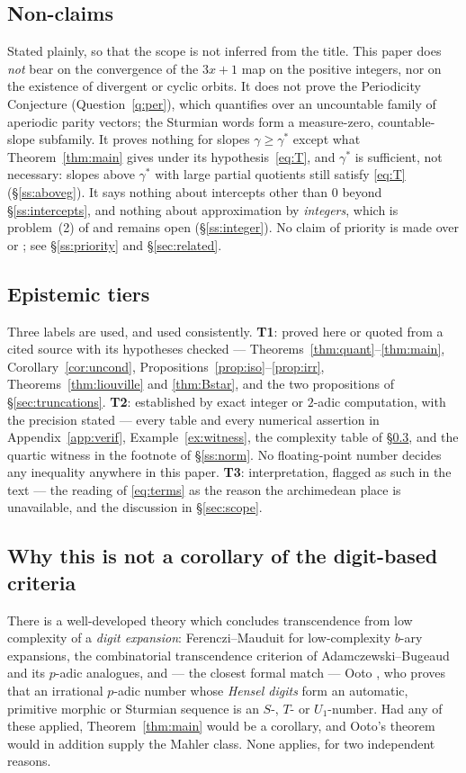 \documentclass[11pt,reqno]{amsart}
\theoremstyle{plain}
\theoremstyle{definition}
\newcommand{\gs}{\gamma^{*}}
\begin{document}
\subsection{Non-claims}\label{ss:nonclaims}
Stated plainly, so that the scope is not inferred from the title. This paper does \emph{not} bear on
the convergence of the $3x+1$ map on the positive integers, nor on the existence of divergent or
cyclic orbits. It does not prove the Periodicity Conjecture (Question~\ref{q:per}), which quantifies
over an uncountable family of aperiodic parity vectors; the Sturmian words form a measure-zero,
countable-slope subfamily. It proves nothing for slopes $\gamma\ge\gs$ except what
Theorem~\ref{thm:main} gives under its hypothesis~\eqref{eq:T}, and $\gs$ is sufficient, not
necessary: slopes above $\gs$ with large partial quotients still satisfy \eqref{eq:T}
(\S\ref{ss:aboveg}). It says nothing about intercepts other than $0$ beyond \S\ref{ss:intercepts},
and nothing about approximation by \emph{integers}, which is problem~(2) of \cite[\S12]{DJirr} and
remains open (\S\ref{ss:integer}). No claim of priority is made over \cite{Allikvere26} or
\cite{Cassidy26}; see \S\ref{ss:priority} and \S\ref{sec:related}.

\subsection{Epistemic tiers}\label{ss:tiers}
Three labels are used, and used consistently. \textbf{T1}: proved here or quoted from a cited source
with its hypotheses checked --- Theorems~\ref{thm:quant}--\ref{thm:main},
Corollary~\ref{cor:uncond}, Propositions~\ref{prop:iso}--\ref{prop:irr},
Theorems~\ref{thm:liouville} and \ref{thm:Bstar}, and the two propositions of
\S\ref{sec:truncations}. \textbf{T2}: established by exact integer or $2$-adic computation, with the
precision stated --- every table and every numerical assertion in Appendix~\ref{app:verif},
Example~\ref{ex:witness}, the complexity table of \S\ref{ss:notcor}, and the quartic witness in the
footnote of \S\ref{ss:norm}. No floating-point number decides any inequality anywhere in this paper.
\textbf{T3}: interpretation, flagged as such in the text --- the reading of \eqref{eq:terms} as the
reason the archimedean place is unavailable, and the discussion in \S\ref{sec:scope}.

\subsection{Why this is not a corollary of the digit-based criteria}\label{ss:notcor}
There is a well-developed theory which concludes transcendence from low complexity of a \emph{digit
expansion}: Ferenczi--Mauduit \cite{FM97} for low-complexity $b$-ary expansions, the combinatorial
transcendence criterion of Adamczewski--Bugeaud \cite{AB07} and its $p$-adic analogues, and --- the
closest formal match --- Ooto \cite{Ooto16}, who proves that an irrational $p$-adic number whose
\emph{Hensel digits} form an automatic, primitive morphic or Sturmian sequence is an $S$-, $T$- or
$U_1$-number. Had any of these applied, Theorem~\ref{thm:main} would be a corollary, and Ooto's
theorem would in addition supply the Mahler class. None applies, for two independent reasons.
\end{document}
